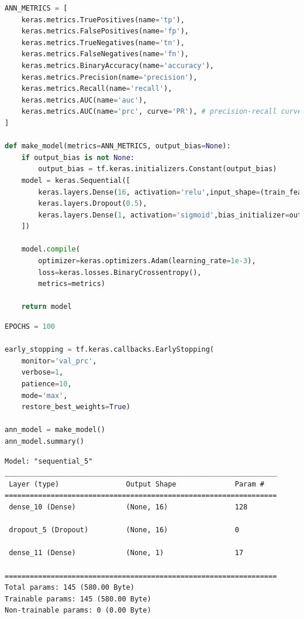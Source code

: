 \documentclass{article}
\begin{document}
\begin{lstlisting}[language=Python]
ANN_METRICS = [
    keras.metrics.TruePositives(name='tp'),
    keras.metrics.FalsePositives(name='fp'),
    keras.metrics.TrueNegatives(name='tn'),
    keras.metrics.FalseNegatives(name='fn'), 
    keras.metrics.BinaryAccuracy(name='accuracy'),
    keras.metrics.Precision(name='precision'),
    keras.metrics.Recall(name='recall'),
    keras.metrics.AUC(name='auc'),
    keras.metrics.AUC(name='prc', curve='PR'), # precision-recall curve
]

def make_model(metrics=ANN_METRICS, output_bias=None):
    if output_bias is not None:
        output_bias = tf.keras.initializers.Constant(output_bias)
    model = keras.Sequential([
        keras.layers.Dense(16, activation='relu',input_shape=(train_features.shape[-1],)),
        keras.layers.Dropout(0.5),
        keras.layers.Dense(1, activation='sigmoid',bias_initializer=output_bias),
    ])

    model.compile(
        optimizer=keras.optimizers.Adam(learning_rate=1e-3),
        loss=keras.losses.BinaryCrossentropy(),
        metrics=metrics)

    return model
\end{lstlisting}
\begin{lstlisting}[language=Python]
EPOCHS = 100

early_stopping = tf.keras.callbacks.EarlyStopping(
    monitor='val_prc', 
    verbose=1,
    patience=10,
    mode='max',
    restore_best_weights=True)

ann_model = make_model()
ann_model.summary()
\end{lstlisting}
\begin{verbatim}
Model: "sequential_5"
_________________________________________________________________
 Layer (type)                Output Shape              Param #   
=================================================================
 dense_10 (Dense)            (None, 16)                128       
                                                                 
 dropout_5 (Dropout)         (None, 16)                0         
                                                                 
 dense_11 (Dense)            (None, 1)                 17        
                                                                 
=================================================================
Total params: 145 (580.00 Byte)
Trainable params: 145 (580.00 Byte)
Non-trainable params: 0 (0.00 Byte)
\end{verbatim}
\end{document}
